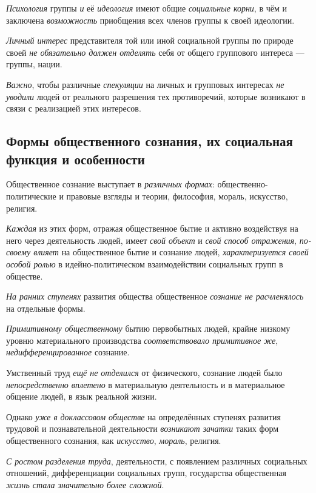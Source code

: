 \documentclass[a4paper,14pt,russian]{extreport}
\begin{document}
\emph{Психология} группы \emph{и} её \emph{идеология} имеют общие \emph{социальные корни}, в чём и заключена \emph{возможность} приобщения всех членов группы к своей идеологии.

\emph{Личный интерес} представителя той или иной социальной группы по природе своей \emph{не обязательно должен отделять} себя от общего группового интереса --- группы, нации.

\emph{Важно}, чтобы различные \emph{спекуляции} на личных и групповых интересах \emph{не уводили} людей от реального разрешения тех противоречий, которые возникают в связи с реализацией этих интересов.

\subsection{Формы общественного сознания, их социальная функция и особенности}

Общественное сознание выступает в \emph{различных формах}: общественно-политические и правовые взгляды и теории, философия, мораль, искусство, религия.

\emph{Каждая} из этих форм, отражая общественное бытие и активно воздействуя на него через деятельность людей, имеет \emph{свой объект} и \emph{свой способ отражения}, \emph{по-своему влияет} на общественное бытие и сознание людей, \emph{характеризуется своей особой ролью} в идейно-политическом взаимодействии социальных групп в обществе.

\emph{На ранних ступенях} развития общества общественное \emph{сознание не расчленялось} на отдельные формы.

\emph{Примитивному общественному} бытию первобытных людей, крайне низкому уровню материального производства \emph{соответствовало примитивное же}, \emph{недифференцированное} сознание.

Умственный труд \emph{ещё не отделился} от физического, сознание людей было \emph{непосредственно вплетено} в материальную деятельность и в материальное общение людей, в язык реальной жизни.

Однако \emph{уже в доклассовом обществе} на определённых ступенях развития трудовой и познавательной деятельности \emph{возникают зачатки} таких форм общественного сознания, как \emph{искусство}, \emph{мораль}, религия.

\emph{С ростом разделения труда}, деятельности, с появлением различных социальных отношений, дифференциации социальных групп, государства общественная \emph{жизнь стала значительно более сложной}.
\end{document}
